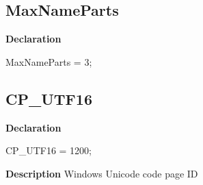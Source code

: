 \documentclass{report}
\newif\ifpdf
\begin{document}
\subsection*{MaxNameParts}
\fi
\label{PasDoc_Types-MaxNameParts}
\begin{list}{}{
\setlength{\itemindent}{0cm}
\setlength{\listparindent}{0cm}
\setlength{\leftmargin}{\evensidemargin}
\addtolength{\leftmargin}{\tmplength}
\settowidth{\labelsep}{X}
\addtolength{\leftmargin}{\labelsep}
\setlength{\labelwidth}{\tmplength}
}
\item[\textbf{Declaration}\hfill]
\ifpdf
\begin{flushleft}
\fi
\begin{ttfamily}
MaxNameParts = 3;\end{ttfamily}

\ifpdf
\end{flushleft}
\fi

\end{list}
\ifpdf
\subsection*{\large{\textbf{CP{\_}UTF16}}\normalsize\hspace{1ex}\hrulefill}
\else
\subsection*{CP{\_}UTF16}
\fi
\label{PasDoc_Types-CP_UTF16}
\begin{list}{}{
\setlength{\itemindent}{0cm}
\setlength{\listparindent}{0cm}
\setlength{\leftmargin}{\evensidemargin}
\addtolength{\leftmargin}{\tmplength}
\settowidth{\labelsep}{X}
\addtolength{\leftmargin}{\labelsep}
\setlength{\labelwidth}{\tmplength}
}
\item[\textbf{Declaration}\hfill]
\ifpdf
\begin{flushleft}
\fi
\begin{ttfamily}
CP{\_}UTF16      = 1200;\end{ttfamily}

\ifpdf
\end{flushleft}
\fi

\par
\item[\textbf{Description}]
Windows Unicode code page ID

\end{list}
\ifpdf
\end{document}
